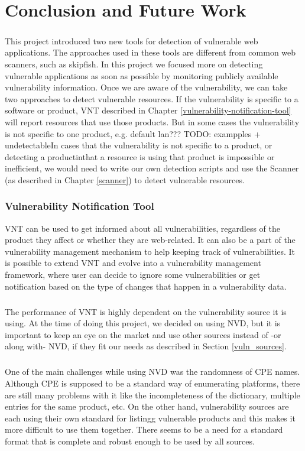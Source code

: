 \chapter{Conclusion and Future Work}
\label{conclusion-and-future-work}
\thispagestyle{empty}
\paragraph{}
This project introduced two new tools for detection of vulnerable web applications. The approaches used in these tools are different from common web scanners, such as skipfish. In this project we focused more on detecting vulnerable applications as soon as possible by monitoring publicly available vulnerability information. Once we are aware of the vulnerability, we can take two approaches to detect vulnerable resources. If the vulnerability is specific to a software or product, VNT described in Chapter \ref{vulnerability-notification-tool} will report resources that use those products. But in some cases the vulnerability is not specific to one product, e.g. default lan??? TODO: exampples + undetectableIn cases that the vulnerability is not specific to a product, or detecting a productinthat a resource is using that product is impossible or inefficient, we would need to write our own detection scripts and use the Scanner (as described in Chapter \ref{scanner}) to detect vulnerable resources.
\subsection{Vulnerability Notification Tool}
VNT can be used to get informed about all vulnerabilities, regardless of the product they affect or whether they are web-related. It can also be a part of the vulnerability management mechanism to help keeping track of vulnerabilities. It is possible to extend VNT and evolve into a vulnerability management framework, where user can decide to ignore some vulnerabilities or get notification based on the type of changes that happen in a vulnerability data.
\paragraph{}
The performance of VNT is highly dependent on the vulnerability source it is using. At the time of doing this project, we decided on using NVD,  but it is important to keep an eye on the market and use other sources instead of -or along with- NVD, if they fit our needs as described in Section \ref{vuln_sources}. 
\paragraph{}
One of the main challenges while using NVD was the randomness of CPE names. Although CPE is supposed to be a standard way of enumerating platforms, there are still many problems with it like the incompleteness of the dictionary, multiple entries for the same product, etc. On the other hand, vulnerability sources are each using their own standard for listingg vulnerable products and this makes it more difficult to use them together. There seems to be a need for a standard format that is complete and robust enough to be used by all sources. 
